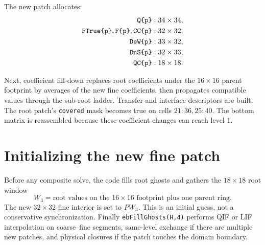 \documentclass[11pt,oneside,openany]{book}
\newcommand{\code}[1]{\textnormal{\texttt{#1}}}
\begin{document}
The new patch allocates:
\begin{align*}
 \code{Q\{p\}}&:34\times34,\\
 \code{FTrue\{p\}},\code{F\{p\}},\code{CC\{p\}}&:32\times32,\\
 \code{DeW\{p\}}&:33\times32,\\
 \code{DnS\{p\}}&:32\times33,\\
 \code{QC\{p\}}&:18\times18.
\end{align*}

Next, coefficient fill-down replaces root coefficients under the $16\times16$ parent footprint by averages of the new fine coefficients, then propagates compatible values through the sub-root ladder. Transfer and interface descriptors are built. The root patch's \code{covered} mask becomes true on cells $21{:}36,25{:}40$. The bottom matrix is reassembled because these coefficient changes can reach level 1.

\section{Initializing the new fine patch}
Before any composite solve, the code fills root ghosts and gathers the $18\times18$ root window
\[
 W_3=\text{root values on the }16\times16\text{ footprint plus one parent ring}.
\]
The new $32\times32$ fine interior is set to $P W_3$. This is an initial guess, not a conservative synchronization. Finally \code{ebFillGhosts(H,4)} performs QIF or LIF interpolation on coarse--fine segments, same-level exchange if there are multiple new patches, and physical closures if the patch touches the domain boundary.
\end{document}
